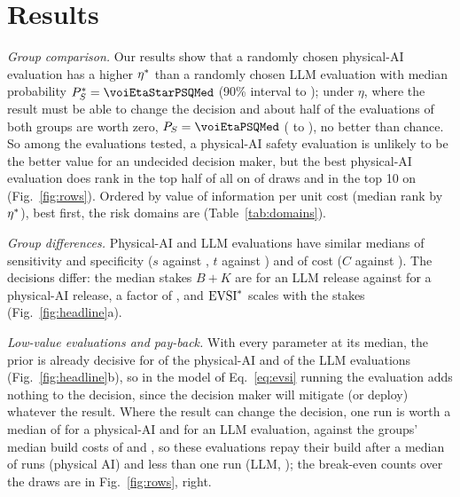 \section{Results}
\label{sec:results}

\emph{Group comparison.} Our results show that a randomly chosen physical-AI evaluation has a higher $\eta^{*}$ than a randomly chosen LLM evaluation with median probability $\PSst=\voiEtaStarPSQMed$\ifextended{} (90\% interval \voiEtaStarPSQLo{} to \voiEtaStarPSQHi)\fi; under $\eta$, where the result must be able to change the decision and about half of the evaluations of both groups are worth zero, $\PS=\voiEtaPSQMed$\ifextended{} (\voiEtaPSQLo{} to \voiEtaPSQHi)\fi, no better than chance. %
So among the evaluations tested, a physical-AI safety evaluation is unlikely to be the better value for an undecided decision maker, but the best physical-AI evaluation does rank in the top half of all \voiNScenarios{} on \voiEtaStarPBestPhysicalTopHalf{} of draws and in the top 10 on \voiEtaStarPBestPhysicalTopTen{} (Fig.~\ref{fig:rows}). Ordered by value of information per unit cost (median rank by $\eta^{*}$), best first, the risk domains are \voiDomainOrder\ifextended{} (Table~\ref{tab:domains})\fi. %

\emph{Group differences.} Physical-AI and LLM evaluations have similar medians of sensitivity and specificity ($s$ \voiMedSPhysical{} against \voiMedSLLM, $t$ \voiMedTPhysical{} against \voiMedTLLM) and of cost ($C$ \voiMedCPhysical{} against \voiMedCLLM). The decisions differ: the median stakes $B+K$ are \voiMedStakesLLM{} for an LLM release against \voiMedStakesPhysical{} for a physical-AI release, a factor of \voiStakesRatio, and $\mathrm{EVSI}^{*}$ scales with the stakes (Fig.~\ref{fig:headline}a). %

\emph{Low-value evaluations and pay-back.} With every parameter at its median, the prior is already decisive for \voiZeroSharePhysical{} of the physical-AI and \voiZeroShareLLM{} of the LLM evaluations (Fig.~\ref{fig:headline}b), so in the model of Eq.~\ref{eq:evsi} running the evaluation adds nothing to the decision, since the decision maker will mitigate (or deploy) whatever the result. Where the result can change the decision, one run is worth a median of \voiMedEVSIChangingPhysical{} for a physical-AI and \voiMedEVSIChangingLLM{} for an LLM evaluation, against the groups' median build costs of \voiMedCbuildPhysical{} and \voiMedCbuildLLM, so these evaluations repay their build after a median of \voiNstarMedianPhysical{} runs (physical AI) and less than one run (LLM, \voiNstarMedianLLM); the break-even counts over the draws are in Fig.~\ref{fig:rows}, right. %

